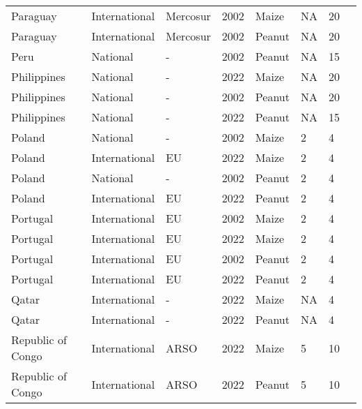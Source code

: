 \begin{landscape}
\begin{longtable}[c]{llllllll}
Paraguay          & International & Mercosur & 2002 & Maize  & NA & 20 & \citet{MERCOSUR2002}         \\
Paraguay          & International & Mercosur & 2002 & Peanut & NA & 20 & \citet{MERCOSUR2002}         \\
Peru              & National      & -        & 2002 & Peanut & NA & 15 & \citet{van2004worldwide}     \\
Philippines       & National      & -        & 2022 & Maize  & NA & 20 & \citet{BAFPS2015}            \\
Philippines       & National      & -        & 2002 & Peanut & NA & 20 & \citet{van2004worldwide}     \\
Philippines       & National      & -        & 2022 & Peanut & NA & 15 & \citet{BAFPS2015}            \\
Poland            & National      & -        & 2002 & Maize  & 2  & 4  & \citet{van2004worldwide}     \\
Poland            & International & EU       & 2022 & Maize  & 2  & 4  & \citet{EC2010}               \\
Poland            & National      & -        & 2002 & Peanut & 2  & 4  & \citet{van2004worldwide}     \\
Poland            & International & EU       & 2022 & Peanut & 2  & 4  & \citet{EC2010}               \\
Portugal          & International & EU       & 2002 & Maize  & 2  & 4  & \citet{EC2010}               \\
Portugal          & International & EU       & 2022 & Maize  & 2  & 4  & \citet{EC2010}               \\
Portugal          & International & EU       & 2002 & Peanut & 2  & 4  & \citet{EC2010}               \\
Portugal          & International & EU       & 2022 & Peanut & 2  & 4  & \citet{EC2010}               \\
Qatar             & International & -        & 2022 & Maize  & NA & 4  & \citet{van2004worldwide}     \\
Qatar             & International & -        & 2022 & Peanut & NA & 4  & \citet{van2004worldwide}     \\
Republic of Congo & International & ARSO     & 2022 & Maize  & 5  & 10 & \citet{ARSO2022}             \\
Republic of Congo & International & ARSO     & 2022 & Peanut & 5  & 10 & \citet{ARSO2022}             \\

\end{longtable}
\end{landscape}
